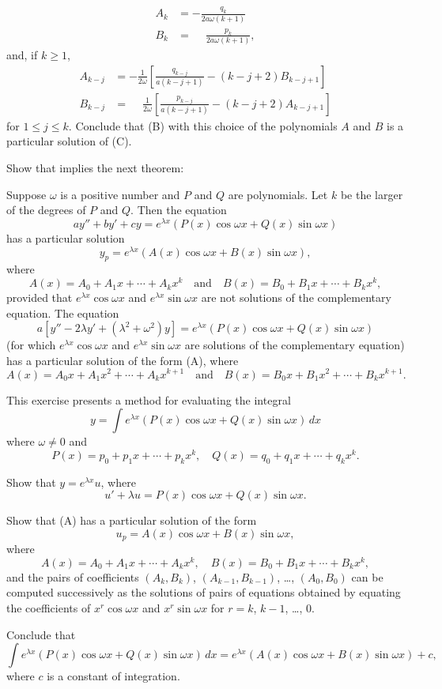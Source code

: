 \begin{exerciselist}
\begin{alist}
\begin{align*}
A_k&=-\frac{q_k}{2a\omega(k+1)}\\
B_k&=\phantom{-}\frac{p_k}{2a\omega(k+1)},
\end{align*}
and, if $k\ge 1$,
\begin{align*}
A_{k-j}&=-\frac{1}{2\omega}
\left[\frac{q_{k-j}}{a(k-j+1)}-(k-j+2)B_{k-j+1}\right]\\
B_{k-j}&=\phantom{-}\frac{1}{2\omega}
\left[\frac{p_{k-j}}{a(k-j+1)}-(k-j+2)A_{k-j+1}\right]
\end{align*}
for $1\le j\le k$.
Conclude that (B) with this choice of the
polynomials $A$ and $B$ is a particular solution of
(C).
\end{alist}

\item\label{exer:5.5.38}Show that   implies the next theorem:
\begin{theorem*}
Suppose $\omega$ is a positive  number and $P$ and $Q$
are polynomials. Let $k$ be the larger of the degrees of $P$ and $Q$.
Then the equation
\[
ay''+by'+cy=e^{\lambda x}\left(P(x)\cos \omega x+Q(x)\sin \omega
x\right)
\]
has a particular solution
\[
y_p=e^{\lambda x}\left(A(x)\cos\omega x+B(x)\sin\omega x\right),
\tag{A}
\]
where
\[
A(x)=A_0+A_1x+\cdots+A_kx^k \quad\text{and}\quad 
B(x)=B_0+B_1x+\cdots+B_kx^k,
\]
provided that $e^{\lambda x}\cos\omega x$ and $e^{\lambda x}\sin\omega
x$ are not solutions of  the complementary equation. The equation
\[
a\left[y''-2\lambda
y'+(\lambda^2+\omega^2)y\right]=
e^{\lambda x}\left(P(x)\cos \omega x+Q(x)\sin \omega x\right)
\]
(for which $e^{\lambda x}\cos\omega x$ and $e^{\lambda x}\sin\omega
x$ are
solutions of the complementary equation) has a particular solution
of the form (A), where
\[
A(x)=A_0x+A_1x^2+\cdots+A_kx^{k+1} \quad\text{and}\quad 
B(x)=B_0x+B_1x^2+\cdots+B_kx^{k+1}.
\]
\end{theorem*}

\item\label{exer:5.5.39}This exercise presents a method for evaluating the integral
\[
y=\int e^{\lambda x}\left(P(x)\cos \omega x+Q(x)\sin \omega x\right)\,dx
\]
where $\omega\ne0$ and
\[
P(x)=p_0+p_1x+\cdots+p_kx^k,\quad Q(x)=q_0+q_1x+\cdots+q_kx^k.
\]
\begin{alist}
\item %
Show that $y=e^{\lambda x}u$, where
\[
u'+\lambda u=P(x)\cos \omega x+Q(x)\sin \omega x.
\tag{A}
\]
\item %
Show that  (A) has a particular solution of the form
\[
u_p=A(x)\cos \omega x+B(x)\sin \omega x,
\]
where
\[
A(x)=A_0+A_1x+\cdots+A_kx^k,\quad B(x)=B_0+B_1x+\cdots+B_kx^k,
\]
and  the pairs of coefficients
$(A_k,B_k)$, $(A_{k-1},B_{k-1})$, \dots, $(A_0,B_0)$
can be computed successively as the solutions of pairs of equations
obtained  by equating the coefficients
of $x^r\cos\omega x$ and $x^r\sin\omega x$ for $r=k$, $k-1$, \dots, $0$.
\item %
Conclude that
\[
\int e^{\lambda x}\left(P(x)\cos \omega x+Q(x)\sin \omega x\right)\,dx
= e^{\lambda x}\left(A(x)\cos \omega x+B(x)\sin \omega x\right) +c,
\]
where $c$ is a constant of integration.
\end{alist}


\end{exerciselist}
